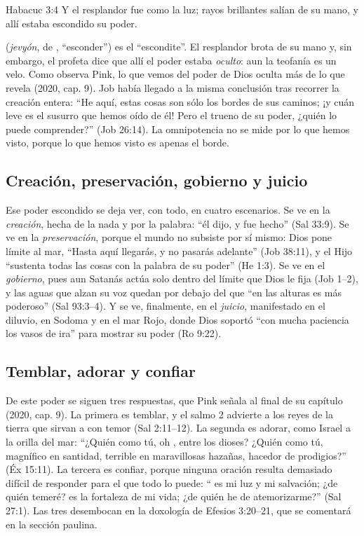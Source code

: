 \begin{verso}{Habacuc 3:4}
Y el resplandor fue como la luz; rayos brillantes salían de su mano, y allí estaba escondido su poder.
\end{verso}

 (\emph{jevyón}, de , ``esconder'') es el ``escondite''. El resplandor brota de su mano y, sin embargo, el profeta dice que allí el poder estaba \emph{oculto}: aun la teofanía es un velo. Como observa Pink, lo que vemos del poder de Dios oculta más de lo que revela (2020, cap. 9). Job había llegado a la misma conclusión tras recorrer la creación entera: ``He aquí, estas cosas son sólo los bordes de sus caminos; ¡y cuán leve es el susurro que hemos oído de él! Pero el trueno de su poder, ¿quién lo puede comprender?'' (Job 26:14). La omnipotencia no se mide por lo que hemos visto, porque lo que hemos visto es apenas el borde.

\subsection{Creación, preservación, gobierno y juicio}
Ese poder escondido se deja ver, con todo, en cuatro escenarios. Se ve en la \emph{creación}, hecha de la nada y por la palabra: ``él dijo, y fue hecho'' (Sal 33:9). Se ve en la \emph{preservación}, porque el mundo no subsiste por sí mismo: Dios pone límite al mar, ``Hasta aquí llegarás, y no pasarás adelante'' (Job 38:11), y el Hijo ``sustenta todas las cosas con la palabra de su poder'' (He 1:3). Se ve en el \emph{gobierno}, pues aun Satanás actúa solo dentro del límite que Dios le fija (Job 1--2), y las aguas que alzan su voz quedan por debajo del \SENOR{} que ``en las alturas es más poderoso'' (Sal 93:3--4). Y se ve, finalmente, en el \emph{juicio}, manifestado en el diluvio, en Sodoma y en el mar Rojo, donde Dios soportó ``con mucha paciencia los vasos de ira'' para mostrar su poder (Ro 9:22).

\subsection{Temblar, adorar y confiar}
De este poder se siguen tres respuestas, que Pink señala al final de su capítulo (2020, cap. 9). La primera es temblar, y el salmo 2 advierte a los reyes de la tierra que sirvan a \SENOR{} con temor (Sal 2:11--12). La segunda es adorar, como Israel a la orilla del mar: ``¿Quién como tú, oh \SENOR, entre los dioses? ¿Quién como tú, magnífico en santidad, terrible en maravillosas hazañas, hacedor de prodigios?'' (Éx 15:11). La tercera es confiar, porque ninguna oración resulta demasiado difícil de responder para el que todo lo puede: ``\SENOR{} es mi luz y mi salvación; ¿de quién temeré? \SENOR{} es la fortaleza de mi vida; ¿de quién he de atemorizarme?'' (Sal 27:1). Las tres desembocan en la doxología de Efesios 3:20--21, que se comentará en la sección paulina.

